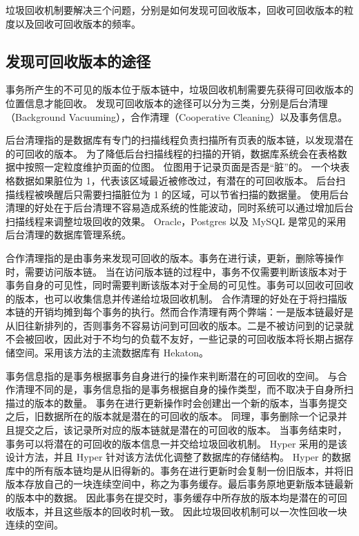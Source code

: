 垃圾回收机制要解决三个问题，分别是如何发现可回收版本，回收可回收版本的粒度以及回收可回收版本的频率。

\subsection{发现可回收版本的途径}

事务所产生的不可见的版本位于版本链中，垃圾回收机制需要先获得可回收版本的位置信息才能回收。
发现可回收版本的途径可以分为三类，分别是后台清理（Background Vacuuming），合作清理（Cooperative Cleaning）以及事务信息。

后台清理指的是数据库有专门的扫描线程负责扫描所有页表的版本链，以发现潜在的可回收的版本。
为了降低后台扫描线程的扫描的开销，数据库系统会在表格数据中按照一定粒度维护页面的位图。
位图用于记录页面是否是“脏”的。
一个块表格数据如果脏位为 1，代表该区域最近被修改过，有潜在的可回收版本。
后台扫描线程被唤醒后只需要扫描脏位为 1 的区域，可以节省扫描的数据量。
使用后台清理的好处在于后台清理不容易造成系统的性能波动，同时系统可以通过增加后台扫描线程来调整垃圾回收的效果。
Oracle，Postgres\cite{pg} 以及 MySQL 是常见的采用后台清理的数据库管理系统。

合作清理指的是由事务来发现可回收的版本。事务在进行读，更新，删除等操作时，需要访问版本链。
当在访问版本链的过程中，事务不仅需要判断该版本对于事务自身的可见性，同时需要判断该版本对于全局的可见性。事务可以回收可回收的版本，也可以收集信息并传递给垃圾回收机制。
合作清理的好处在于将扫描版本链的开销均摊到每个事务的执行。然而合作清理有两个弊端：一是版本链最好是从旧往新排列的，否则事务不容易访问到可回收的版本。二是不被访问到的记录就不会被回收，因此对于不均匀的负载不友好，一些记录的可回收版本将长期占据存储空间。采用该方法的主流数据库有 Hekaton\cite{hekaton}。

事务信息指的是事务根据事务自身进行的操作来判断潜在的可回收的空间。
与合作清理不同的是，事务信息指的是事务根据自身的操作类型，而不取决于自身所扫描过的版本的数量。
事务在进行更新操作时会创建出一个新的版本，当事务提交之后，旧数据所在的版本就是潜在的可回收的版本。
同理，事务删除一个记录并且提交之后，该记录所对应的版本链就是潜在的可回收的版本。
当事务结束时，事务可以将潜在的可回收的版本信息一并交给垃圾回收机制。
Hyper\cite{hyper} 采用的是该设计方法，并且 Hyper 针对该方法优化调整了数据库的存储结构。
Hyper 的数据库中的所有版本链均是从旧得新的。事务在进行更新时会复制一份旧版本，并将旧版本存放自己的一块连续空间中，称之为事务缓存。最后事务原地更新版本链最新的版本中的数据。
因此事务在提交时，事务缓存中所存放的版本均是潜在的可回收版本，并且这些版本的回收时机一致。
因此垃圾回收机制可以一次性回收一块连续的空间。


